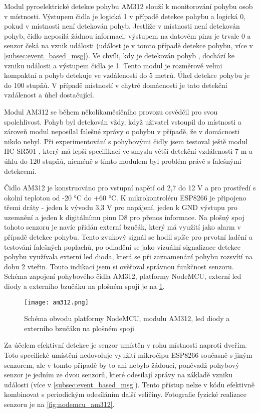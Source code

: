 Modul pyroelektrické detekce pohybu AM312 \cite{AM312:online} slouží k monitorování pohybu osob v místnosti. Výstupem čidla je logická 1 v případě detekce pohybu a logická 0, pokud v místnosti není detekován pohyb. Jestliže v místnosti není detekován pohyb, čidlo neposílá žádnou informaci, výstupem na datovém pinu je trvale 0 a senzor čeká na vznik události (událost je v tomto případě detekce pohybu, více v \cref{subsec:event_based_msg}). Ve chvíli, kdy je detekován pohyb , dochází ke vzniku události a výstupem čidla je 1. Tento modul je rozměrově velmi kompaktní a pohyb detekuje ve vzdálenosti do 5 metrů. Úhel detekce pohybu je do 100 stupňů. V případě místností v chytré domácnosti je tato detekční vzdálenost a úhel dostačující. \par 
Modul AM312 se během několikaměsíčního provozu osvědčil pro svou spolehlivost. Pohyb byl detekován vždy, když uživatel vstoupil do místnosti a zároveň modul neposílal falešné zprávy o pohybu v případě, že v domácnosti nikdo nebyl. Při experimentování s pohybovými čidly jsem testoval ještě modul HC-SR501 \cite{HC-SR501:Datasheet}, který má lepší specifikaci ve smyslu větší detekční vzdálenosti 7 m a úhlu do 120 stupňů, nicméně s tímto modulem byl problém právě s falešnými detekcemi. \par
Čidlo AM312 je konstruováno pro vstupní napětí od 2,7 do 12 V a pro prostředí s okolní teplotou od -20 \si{\degree}C do +60 \si{\degree}C. K mikrokontroléru ESP8266 je připojeno třemi dráty - jeden k vývodu 3,3 V pro napájení, jeden k GND výstupu pro uzemnění a jeden k digitálnímu pinu D8 pro přenos informace. Na plošný spoj tohoto senzoru je navíc přidán externí bzučák, který má využití jako alarm v případě detekce pohybu. Tento zvukový signál se hodil spíše pro prvotní ladění a testování falešných poplachů, po odladění se jako vizuální signalizace detekce pohybu využívala externí led dioda, která se při zaznamenání pohybu rozsvítí na dobu 2 vteřin. Touto indikací jsem si ověřoval správnou funkčnost senzoru. Schéma zapojení pohybového čidla AM312, platformy NodeMCU, externí led diody a externího bzučáku na plošném spoji je na \cref{fig:schema_esp_am312}. 

\begin{figure}[H]
  \centering
  \texttt{[image: am312.png]}
  \caption{Schéma obvodu platformy NodeMCU, modulu AM312, led diody a externího bzučáku na plošném spoji}
  \label{fig:schema_esp_am312}
\end{figure}

Za účelem efektivní detekce je senzor umístěn v rohu místnosti naproti dveřím. Toto specifické umístění nedovoluje využití mikročipu ESP8266 současně s jiným senzorem, ale v tomto případě by to ani nebylo žádoucí, poněvadž pohybový senzor je jedním ze dvou senzorů, které odesílají zprávy na základě vzniku události (více v \cref{subsec:event_based_msg}). Tento přístup nelze v kódu efektivně kombinovat s periodickým odesíláním další veličiny. Fotografie fyzické realizace senzoru je na \cref{fig:nodemcu_am312}.


